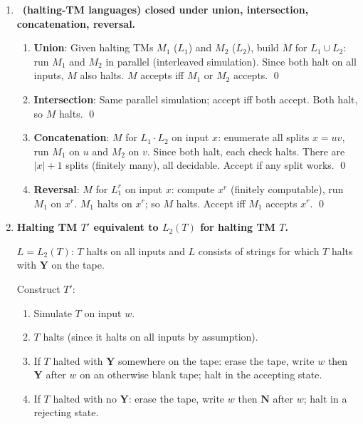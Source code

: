 \begin{enumerate}[{12.}1. ]
\begin{enumerate}
This avoids reprocessing nodes and runs in $O(|V|+|E|)$ time. \qed
\end{enumerate}

\item \textbf{\HSIG\ (halting-TM languages) closed under union, intersection, concatenation, reversal.}

\begin{enumerate}
\item \textbf{Union}: Given halting TMs $M_1$ ($L_1$) and $M_2$ ($L_2$), build $M$ for $L_1\cup L_2$: run $M_1$ and $M_2$ in parallel (interleaved simulation). Since both halt on all inputs, $M$ also halts. $M$ accepts iff $M_1$ or $M_2$ accepts. \qed

\item \textbf{Intersection}: Same parallel simulation; accept iff both accept. Both halt, so $M$ halts. \qed

\item \textbf{Concatenation}: $M$ for $L_1\cdot L_2$ on input $x$: enumerate all splits $x=uv$, run $M_1$ on $u$ and $M_2$ on $v$. Since both halt, each check halts. There are $|x|+1$ splits (finitely many), all decidable. Accept if any split works. \qed

\item \textbf{Reversal}: $M$ for $L_1^r$ on input $x$: compute $x^r$ (finitely computable), run $M_1$ on $x^r$. $M_1$ halts on $x^r$; so $M$ halts. Accept iff $M_1$ accepts $x^r$. \qed
\end{enumerate}

\item \textbf{Halting TM $T'$ equivalent to $L_2(T)$ for halting TM $T$.}

$L = L_2(T)$: $T$ halts on all inputs and $L$ consists of strings for which $T$ halts with $\pmb{Y}$ on the tape.

Construct $T'$:
\begin{enumerate}[1.]
\item Simulate $T$ on input $w$.
\item $T$ halts (since it halts on all inputs by assumption).
\item If $T$ halted with $\pmb{Y}$ somewhere on the tape: erase the tape, write $w$ then $\pmb{Y}$ after $w$ on an otherwise blank tape; halt in the accepting state.
\item If $T$ halted with no $\pmb{Y}$: erase the tape, write $w$ then $\pmb{N}$ after $w$; halt in a rejecting state.
\end{enumerate}


\end{enumerate}
